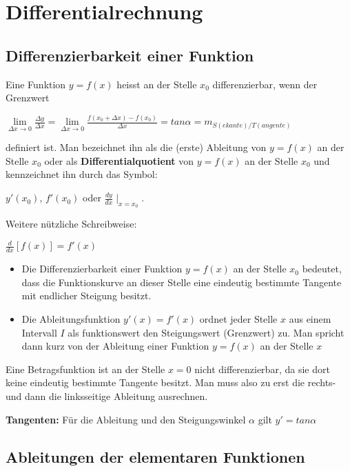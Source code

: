 \documentclass[a4paper,DIV10,12pt,headsepline,smallheadings,halfparskip-]{scrreprt}
\begin{document}
	\chapter{Differentialrechnung}
	\section{Differenzierbarkeit einer Funktion}
	Eine Funktion \(y=f(x)\) heisst an der Stelle \(x_0\) differenzierbar, wenn der Grenzwert

	\( \lim\limits_{\Delta x \rightarrow 0}{\frac{\Delta y}{\Delta x}} = \lim\limits_{\Delta x \rightarrow 0}{\frac{f(x_0 + \Delta x)-f(x_0)}{\Delta x}} = tan \alpha = m_{S(ekante)/T(angente)} \)

	definiert ist. Man bezeichnet ihn als die (erste) Ableitung von \(y=f(x)\) an der Stelle \(x_0\) oder als \textbf{Differentialquotient} von \(y=f(x)\) an der Stelle \(x_0\) und kennzeichnet ihn durch das Symbol:

	 \hspace*{10mm}\(y'(x_0)\), \(f'(x_0)\) oder \(\frac{dy}{dx} \mid_{x=x_0}\).

	Weitere nützliche Schreibweise:

	\hspace*{10mm}\(\frac{d}{dx}[f(x)] = f'(x)\)

	\begin{itemize}
		\item Die Differenzierbarkeit einer Funktion \(y=f(x)\) an der Stelle \(x_0\) bedeutet, dass die Funktionskurve an dieser Stelle eine eindeutig bestimmte Tangente mit endlicher Steigung besitzt.
		\item Die Ableitungsfunktion \(y'(x)=f'(x)\) ordnet jeder Stelle \(x\) aus einem Intervall \(I\) als funktionswert den Steigungswert (Grenzwert) zu. Man spricht dann kurz von der Ableitung einer Funktion \(y=f(x)\) an der Stelle \(x\)
	\end{itemize}
	Eine Betragsfunktion ist an der Stelle \(x=0\) nicht differenzierbar, da sie dort keine eindeutig bestimmte Tangente besitzt. Man muss also zu erst die rechts- und dann die linksseitige Ableitung ausrechnen.
	\par \textbf{Tangenten:} Für die Ableitung und den Steigungswinkel \(\alpha\) gilt \(y'=tan \alpha\)

	\section{Ableitungen der elementaren Funktionen}
\end{document}
